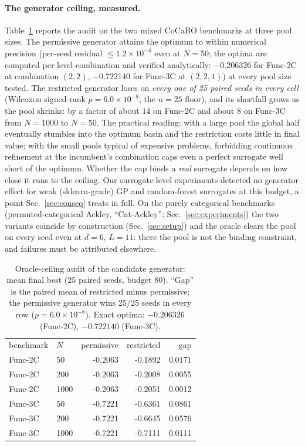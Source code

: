 \documentclass[%
 aip,
 amsmath,amssymb,
 floatfix,
 reprint,%
]{revtex4-1}
\begin{document}
\paragraph{The generator ceiling, measured.}
Table~\ref{tab:oracle} reports the audit on the two mixed CoCaBO
benchmarks at three pool sizes. The permissive generator attains the
optimum to within numerical precision (per-seed residual
$\le 1.2\times10^{-4}$ even at $N{=}50$; the optima are computed per
level-combination and verified analytically:
$-0.206326$ for Func-2C at combination $(2,2)$, $-0.722140$ for Func-3C
at $(2,2,1)$) at every pool size tested. The restricted generator loses
on \emph{every one of 25 paired seeds in every cell} (Wilcoxon
signed-rank $p = 6.0\times10^{-8}$, the $n{=}25$ floor), and its
shortfall grows as the pool shrinks: by a factor of about $14$ on
Func-2C and about $8$ on Func-3C from $N{=}1000$ to $N{=}50$. The
practical reading: with a large pool the global half eventually stumbles
into the optimum basin and the restriction costs little in final value;
with the small pools typical of expensive problems, forbidding continuous
refinement at the incumbent's combination caps even a perfect surrogate
well short of the optimum. Whether the cap binds a \emph{real} surrogate
depends on how close it runs to the ceiling. Our surrogate-level
experiments detected no generator effect for weak (sklearn-grade) GP and
random-forest surrogates at this budget, a point Sec.~\ref{sec:conseq}
treats in full. On the purely categorical benchmarks (permuted-categorical Ackley,
``Cat-Ackley''; Sec.~\ref{sec:experiments})
the two variants coincide by construction (Sec.~\ref{sec:setup}) and the
oracle clears the pool on every seed even at $d{=}6$, $L{=}11$: there the
pool is not the binding constraint, and failures must be attributed
elsewhere.

\begin{table}[t]
\caption{\label{tab:oracle}Oracle-ceiling audit of the candidate
generator: mean final best (25 paired seeds, budget 80). ``Gap'' is the
paired mean of restricted minus permissive; the permissive generator wins
25/25 seeds in every row ($p = 6.0\times10^{-8}$). Exact optima:
$-0.206326$ (Func-2C), $-0.722140$ (Func-3C).}
\begin{ruledtabular}
\begin{tabular}{llrrr}
benchmark & $N$ & permissive & restricted & gap \\
\colrule
Func-2C & 50   & -0.2063 & -0.1892 & 0.0171 \\
Func-2C & 200  & -0.2063 & -0.2008 & 0.0055 \\
Func-2C & 1000 & -0.2063 & -0.2051 & 0.0012 \\
Func-3C & 50   & -0.7221 & -0.6361 & 0.0861 \\
Func-3C & 200  & -0.7221 & -0.6645 & 0.0576 \\
Func-3C & 1000 & -0.7221 & -0.7111 & 0.0111 \\
\end{tabular}
\end{ruledtabular}
\end{table}
\end{document}
